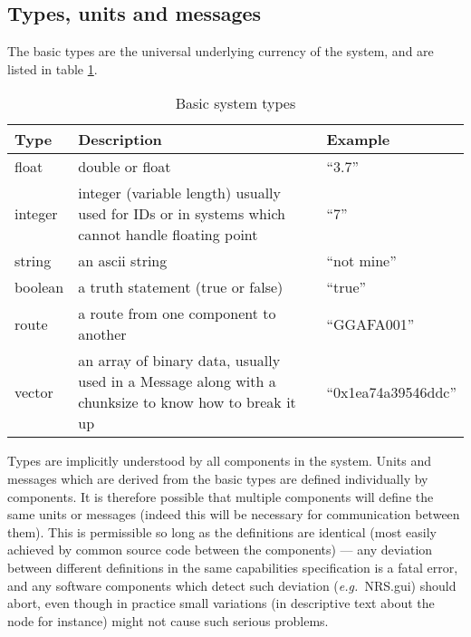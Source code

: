 \documentclass[pdftex,a4paper]{article}
\newcommand{\eg}{{\em e.g.\ }}
\begin{document}
\subsection{Types, units and messages}

The basic types are the universal underlying currency of the system,
and are listed in table \ref{tab:types}.

\begin{table}[!h]
  \begin{center}
    \caption{Basic system types}
    \label{tab:types}
    \begin{tabular}{|l|p{2.5in}|l|}
      \hline

      \textbf{Type} & \textbf{Description} & \textbf{Example}\\

      \hline

      float & double or float & ``3.7''\\

      \hline

      integer & integer (variable length) usually used for IDs or in
      systems which cannot handle floating point & ``7''\\

      \hline

      string & an ascii string & ``not mine''\\

      \hline

      boolean & a truth statement (true or false) & ``true''\\

      \hline

      route & a route from one component to another & ``GGAFA001''\\

      \hline

      vector & an array of binary data, usually used in a Message
      along with a chunksize to know how to break it up &
      ``0x1ea74a39546ddc''\\

      \hline

    \end{tabular}
  \end{center}
\end{table}

Types are implicitly understood by all components in the system. Units
and messages which are derived from the basic types are defined
individually by components. It is therefore possible that multiple
components will define the same units or messages (indeed this will be
necessary for communication between them). This is permissible so long
as the definitions are identical (most easily achieved by common source
code between the components) --- any deviation between different
definitions in the same capabilities specification is a fatal error, and
any software components which detect such deviation (\eg NRS.gui) should
abort, even though in practice small variations (in descriptive text
about the node for instance) might not cause such serious problems.
\end{document}
